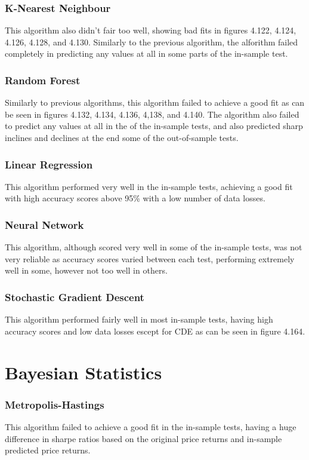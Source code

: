 \subsubsection{K-Nearest Neighbour}
This algorithm also didn't fair too well, showing bad fits in figures 4.122, 4.124, 4.126, 4.128, and 4.130. Similarly to the previous algorithm, the alforithm failed completely in predicting any values at all in some parts of the in-sample test.

\subsubsection{Random Forest}
Similarly to previous algorithms, this algorithm failed to achieve a good fit as can be seen in figures 4.132, 4.134, 4.136, 4,138, and 4.140. The algorithm also failed to predict any values at all in the of the in-sample tests, and also predicted sharp inclines and declines at the end some of the out-of-sample tests.

\subsubsection{Linear Regression} 
This algorithm performed very well in the in-sample tests, achieving a good fit with high accuracy scores above 95\% with a low number of data losses.

\subsubsection{Neural Network}
This algorithm, although scored very well in some of the in-sample tests, was not very reliable as accuracy scores varied between each test, performing extremely well in some, however not too well in others. 

\subsubsection{Stochastic Gradient Descent}
This algorithm performed fairly well in most in-sample tests, having high accuracy scores and low data losses escept for CDE as can be seen in figure 4.164.

\section{Bayesian Statistics}

\subsubsection{Metropolis-Hastings}
This algorithm failed to achieve a good fit in the in-sample tests, having a huge difference in sharpe ratios based on the original price returns and in-sample predicted price returns. 


